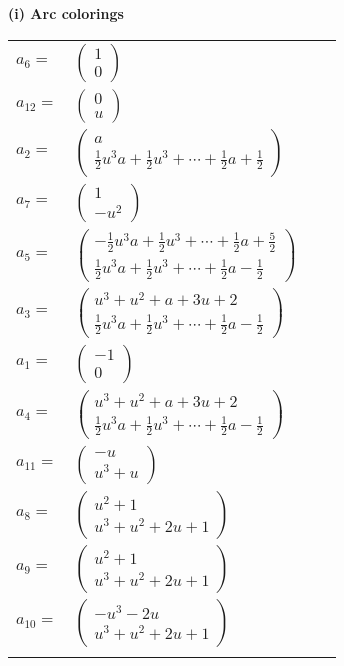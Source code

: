 \documentclass[1p]{elsarticle_modified}
\theoremstyle{definition}
\begin{document}
\flushleft \textbf{(i) Arc colorings}\\
\begin{tabular}{m{7pt} m{180pt} m{7pt} m{180pt} }
\flushright $a_{6}=$&$\begin{pmatrix}1\\0\end{pmatrix}$ \\
\flushright $a_{12}=$&$\begin{pmatrix}0\\u\end{pmatrix}$ \\
\flushright $a_{2}=$&$\begin{pmatrix}a\\\frac{1}{2} u^3 a+\frac{1}{2} u^3+\cdots+\frac{1}{2} a+\frac{1}{2}\end{pmatrix}$ \\
\flushright $a_{7}=$&$\begin{pmatrix}1\\- u^2\end{pmatrix}$ \\
\flushright $a_{5}=$&$\begin{pmatrix}-\frac{1}{2} u^3 a+\frac{1}{2} u^3+\cdots+\frac{1}{2} a+\frac{5}{2}\\\frac{1}{2} u^3 a+\frac{1}{2} u^3+\cdots+\frac{1}{2} a-\frac{1}{2}\end{pmatrix}$ \\
\flushright $a_{3}=$&$\begin{pmatrix}u^3+u^2+a+3 u+2\\\frac{1}{2} u^3 a+\frac{1}{2} u^3+\cdots+\frac{1}{2} a-\frac{1}{2}\end{pmatrix}$ \\
\flushright $a_{1}=$&$\begin{pmatrix}-1\\0\end{pmatrix}$ \\
\flushright $a_{4}=$&$\begin{pmatrix}u^3+u^2+a+3 u+2\\\frac{1}{2} u^3 a+\frac{1}{2} u^3+\cdots+\frac{1}{2} a-\frac{1}{2}\end{pmatrix}$ \\
\flushright $a_{11}=$&$\begin{pmatrix}- u\\u^3+u\end{pmatrix}$ \\
\flushright $a_{8}=$&$\begin{pmatrix}u^2+1\\u^3+u^2+2 u+1\end{pmatrix}$ \\
\flushright $a_{9}=$&$\begin{pmatrix}u^2+1\\u^3+u^2+2 u+1\end{pmatrix}$ \\
\flushright $a_{10}=$&$\begin{pmatrix}- u^3-2 u\\u^3+u^2+2 u+1\end{pmatrix}$\\&\end{tabular}
\end{document}
